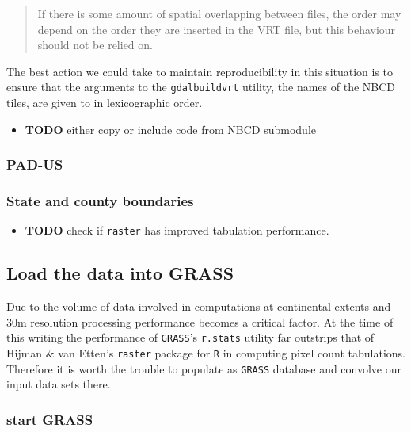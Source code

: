 \documentclass[11pt]{article}
\begin{document}
\begin{quote}
If there is some amount of spatial overlapping between files, the
order may depend on the order they are inserted in the VRT file, but
this behaviour should not be relied on.
\end{quote}

The best action we could take to maintain reproducibility in this
situation is to ensure that the arguments to the \texttt{gdalbuildvrt}
utility, the names of the NBCD tiles, are given to in lexicographic
order.
\begin{itemize}

\item \textbf{TODO} either copy or include code from NBCD submodule
\label{sec-3-2-2-1}%


\end{itemize} %
\subsubsection{PAD-US}
\label{sec-3-2-3}
\subsubsection{State and county boundaries}
\label{sec-3-2-4}
\begin{itemize}

\item \textbf{TODO} check if \texttt{raster} has improved tabulation performance.
\label{sec-3-3-1}%


\end{itemize} %
\subsection{Load the data into GRASS}
\label{sec-3-3}


Due to the volume of data involved in computations at continental
extents and 30m resolution processing performance becomes a critical
factor.  At the time of this writing the performance of \texttt{GRASS}'s
\texttt{r.stats} utility far outstrips that of Hijman \& van Etten's \texttt{raster}
package for \texttt{R} in computing pixel count tabulations.  Therefore it is
worth the trouble to populate as \texttt{GRASS} database and convolve our
input data sets there.
\subsubsection{start GRASS}
\label{sec-3-3-1}
\end{document}
